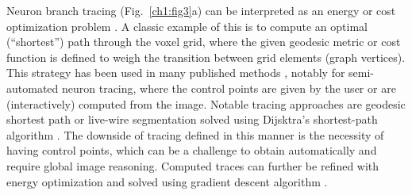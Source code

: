 Neuron branch tracing (Fig.~\ref{ch1:fig3}a) can be interpreted as an energy or cost optimization problem \cite{meijering2004design, peng2010automatic}. A classic example of this is to compute an optimal (``shortest'') path through the voxel grid, where the given geodesic metric or cost function is defined to weigh the transition between grid elements (graph vertices). This strategy has been used in many published methods \cite{meijering2004design, peng2010v3d, longair2011simple}, notably for semi-automated neuron tracing, where the control points are given by the user or are (interactively) computed from the image. Notable tracing approaches are geodesic shortest path \cite{peng2010automatic} or live-wire segmentation \cite{meijering2004design} solved using Dijsktra's shortest-path algorithm \cite{dijkstra1959note}. The downside of tracing defined in this manner is the necessity of having control points, which can be a challenge to obtain automatically and require global image reasoning. Computed traces can further be refined with energy optimization and solved using gradient descent algorithm \cite{peng2007straightening,peng2010automatic}.

